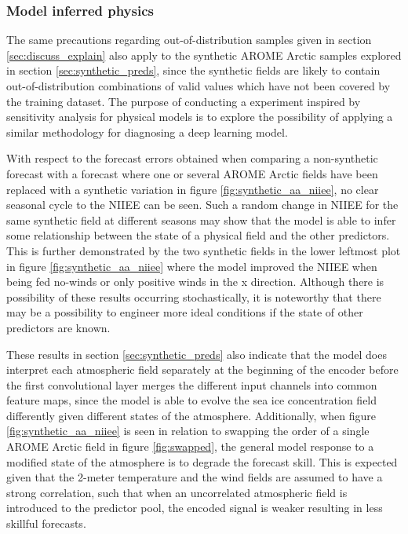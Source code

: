\documentclass[../main/thesis]{subfiles}
\begin{document}
\subsubsection{Model inferred physics}
\label{sec:discuss_model_inferred_phys}
The same precautions regarding out-of-distribution samples given in section \ref{sec:discuss_explain} also apply to the synthetic AROME Arctic samples explored in section \ref{sec:synthetic_preds}, since the synthetic fields are likely to contain out-of-distribution combinations of valid values which have not been covered by the training dataset. The purpose of conducting a experiment inspired by sensitivity analysis for physical models is to explore the possibility of applying a similar methodology for diagnosing a deep learning model.

With respect to the forecast errors obtained when comparing a non-synthetic forecast with a forecast where one or several AROME Arctic fields have been replaced with a synthetic variation in figure \ref{fig:synthetic_aa_niiee}, no clear seasonal cycle to the NIIEE can be seen. Such a random change in NIIEE for the same synthetic field at different seasons may show that the model is able to infer some relationship between the state of a physical field and the other predictors. This is further demonstrated by the two synthetic fields in the lower leftmost plot in figure \ref{fig:synthetic_aa_niiee} where the model improved the NIIEE when being fed no-winds or only positive winds in the x direction. Although there is possibility of these results occurring stochastically, it is noteworthy that there may be a possibility to engineer more ideal conditions if the state of other predictors are known.

These results in section \ref{sec:synthetic_preds} also indicate that the model does interpret each atmospheric field separately at the beginning of the encoder before the first convolutional layer merges the different input channels into common feature maps, since the model is able to evolve the sea ice concentration field differently given different states of the atmosphere. Additionally, when figure \ref{fig:synthetic_aa_niiee} is seen in relation to swapping the order of a single AROME Arctic field in figure \ref{fig:swapped}, the general model response to a modified state of the atmosphere is to degrade the forecast skill. This is expected given that the 2-meter temperature and the wind fields are assumed to have a strong correlation, such that when an uncorrelated atmospheric field is introduced to the predictor pool, the encoded signal is weaker resulting in less skillful forecasts.
\end{document}

